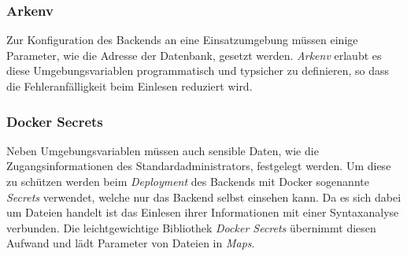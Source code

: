 \subsubsection{Arkenv}
\label{subsubsec:backend:bibs:arkenv}
Zur Konfiguration des Backends an eine Einsatzumgebung müssen einige Parameter, wie die Adresse der Datenbank, gesetzt werden.
\textit{Arkenv} erlaubt es diese Umgebungsvariablen programmatisch und typsicher zu definieren, so dass die Fehleranfälligkeit beim Einlesen reduziert wird.

\subsubsection{Docker Secrets}
\label{subsubsec:backend:bibs:dockersecrets}
Neben Umgebungsvariablen müssen auch sensible Daten, wie die Zugangsinformationen des Standardadministrators, festgelegt werden.
Um diese zu schützen werden beim \textit{Deployment} des Backends mit Docker sogenannte \textit{Secrets} verwendet, welche nur das Backend selbst einsehen kann.
Da es sich dabei um Dateien handelt ist das Einlesen ihrer Informationen mit einer Syntaxanalyse verbunden.
Die leichtgewichtige Bibliothek \textit{Docker Secrets} übernimmt diesen Aufwand und lädt Parameter von Dateien in \textit{Maps}.

